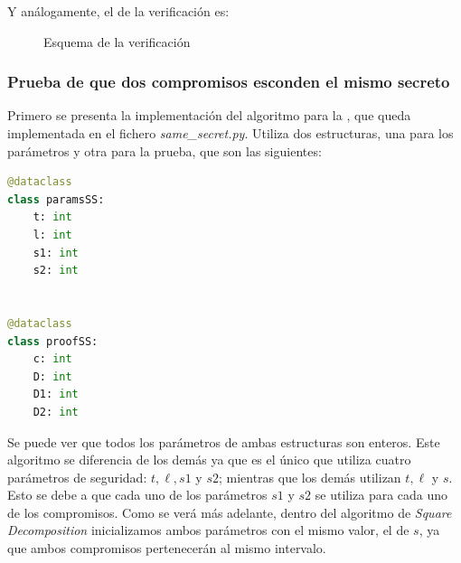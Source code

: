 Y análogamente, el de la verificación es: \\
\begin{figure}[H]
    \centering
    \caption{Esquema de la verificación}
\end{figure}

\subsubsection{Prueba de que dos compromisos esconden el mismo secreto}

Primero se presenta la implementación del algoritmo para la , que queda implementada en el fichero \emph{same\_secret.py}. Utiliza dos estructuras, una para los parámetros y otra para la prueba, que son las siguientes:
\begin{lstlisting}[language=Python, basicstyle=\footnotesize]
@dataclass
class paramsSS:
    t: int
    l: int
    s1: int
    s2: int


@dataclass
class proofSS:
    c: int
    D: int
    D1: int
    D2: int
\end{lstlisting}
Se puede ver que todos los parámetros de ambas estructuras son enteros. Este algoritmo se diferencia de los demás ya que es el único que utiliza cuatro parámetros de seguridad: $t, \ell, s1$ y $s2$; mientras que los demás utilizan $t, \ell$ y $s$. Esto se debe a que cada uno de los parámetros $s1$ y $s2$ se utiliza para cada uno de los compromisos. Como se verá más adelante, dentro del algoritmo de \emph{Square Decomposition} inicializamos ambos parámetros con el mismo valor, el de $s$, ya que ambos compromisos pertenecerán al mismo intervalo.

